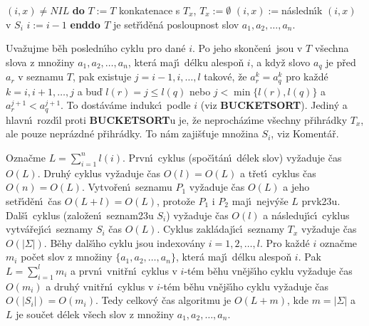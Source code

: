 \phantom{---}{\bf while} $(i,x)\ne NIL$ {\bf do}\newline 
\phantom{------}$T:=T$ konkatenace s $T_x$, $T_x:=\emptyset$\newline 
\phantom{------}$(i,x):=$n\'asledn\'\i k $(i,x)$ v $S_i$\newline 
\phantom{---}{\bf enddo}\newline
\phantom{---}$i:=i-1$\newline 
{\bf enddo\newline 
$T$} je set\v r\'\i d\v en\'a posloupnost slov $a_1,a_2,\dots,a_n$.
\bigskip

\flushpar Uva\v zujme b\v eh posledn\'\i ho cyklu pro dan\'e $i$. Po 
jeho skon\v cen\'\i\ jsou v $T$ v\v sechna slova z mno\v ziny 
$a_1,a_2,\dots,a_n$, kter\'a maj\'\i\ d\'elku alespo\v n $i$, a kdy\v z slovo 
$a_q$ je p\v red $a_r$ v seznamu $T$, pak existuje $j=i-1,i,\dots
,l$
takov\'e, \v ze $a^k_r=a^k_q$ pro ka\v zd\'e $k=i,i+1,\dots,j$ a bu\v d 
$l(r)=j\le l(q)$ nebo $j<\min\{l(r),l(q)\}$ a $a_r^{j+1}<a_q^{j+1}$. To 
dost\'av\'ame indukc\'\i\ podle $i$ (viz {\bf BUCKETSORT}). Jedin\'y a 
hlavn\'\i\ rozd\'\i l proti {\bf BUCKETSORT}u je, \v ze neproch\'az\'\i me 
v\v sechny p\v rihr\'adky $T_x$, ale pouze nepr\'azdn\'e p\v rihr\'adky. 
To n\'am zaji\v s\v tuje mno\v zina $S_i$, viz Koment\'a\v r. 
\medskip

\flushpar Ozna\v cme $L=\sum_{i=1}^nl(i)$. Prvn\'\i\ cyklus (spo\v c\'\i t\'an\'\i\ 
d\'elek slov) vy\-\v zaduje \v cas $O(L)$. Druh\'y cyklus vy\v zaduje 
\v cas $O(l)=O(L)$ a t\v ret\'\i\ cyklus \v cas $O(n)=O(L)$. Vytvo\v ren\'\i\ 
seznamu $P_1$ vy\v zaduje \v cas $O(L)$ a jeho set\v r\'\i d\v en\'\i\ 
\v cas $O(L+l)=O(L)$, proto\v ze $P_1$ i $P_2$ maj\'\i\ nejv\'y\v se $
L$ 
prvk\accent23u. Dal\v s\'\i\ cyklus (zalo\v zen\'\i\ seznam\accent23u 
$S_i$) vy\v zaduje \v cas $O(l)$ a n\'asleduj\'\i c\'\i\ cyklus vytv\'a\v rej\'\i c\'\i\ 
seznamy $S_i$ \v cas $O(L)$. Cyklus zakl\'adaj\'\i c\'\i\ 
seznamy $T_x$ vy\v zaduje \v cas $O(|\Sigma |)$. B\v ehy dal\v s\'\i ho cyklu jsou 
indexov\'any $i=1,2,\dots,l$. Pro ka\v zd\'e $i$ ozna\v cme $m_i$ po\v cet slov z 
mno\v ziny $\{a_1,a_2,\dots,a_n\}$, kter\'a maj\'\i\ d\'elku alespo\v n $
i$. Pak 
$L=\sum_{i=1}^lm_i$ a prvn\'\i\ vnit\v rn\'\i\ cyklus v $i$-t\'em b\v ehu vn\v ej\v s\'\i ho 
cyklu vy\v zaduje \v cas $O(m_i)$ a druh\'y vnit\v rn\'\i\ cyklus v $
i$-t\'em 
b\v ehu vn\v ej\v s\'\i ho cyklu vy\v zaduje \v cas $O(|S_i|)=O(m_
i)$. Tedy 
celkov\'y \v cas algoritmu je $O(L+m)$, kde $m=|\Sigma |$ a $L$ 
je sou\v cet d\'elek v\v sech slov z mno\v ziny $a_1,a_2,\dots,a_
n$.
\medskip

